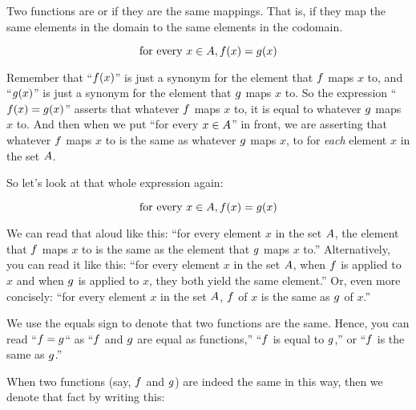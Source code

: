 \documentclass[../../../main.tex]{subfiles}
\begin{document}
\begin{terminology}
  Two functions are  or  if they are the same mappings. That is, if they map the same elements in the domain to the same elements in the codomain.
\end{terminology}

\begin{equation*}
  \text{for every } x \in A, f(x) = g(x)
\end{equation*}

Remember that ``$f(x)$'' is just a synonym for the element that $f$ maps $x$ to, and ``$g(x)$'' is just a synonym for the element that $g$ maps $x$ to. So the expression ``$f(x) = g(x)$'' asserts that whatever $f$ maps $x$ to, it is equal to whatever $g$ maps $x$ to. And then when we put ``for every $x \in A$'' in front, we are asserting that whatever $f$ maps $x$ to is the same as whatever $g$ maps $x$, to for \emph{each} element $x$ in the set $A$.

So let's look at that whole expression again:

\begin{equation*}
  \text{for every } x \in A, f(x) = g(x)
\end{equation*}

We can read that aloud like this: ``for every element $x$ in the set $A$, the element that $f$ maps $x$ to is the same as the element that $g$ maps $x$ to.'' Alternatively, you can read it like this: ``for every element $x$ in the set $A$, when $f$ is applied to $x$ and when $g$ is applied to $x$, they both yield the same element.'' Or, even more concisely: ``for every element $x$ in the set $A$, $f$ of $x$ is the same as $g$ of $x$.''

\begin{aside}
  \begin{remark}
    We use the equals sign to denote that two functions are the same. Hence, you can read ``$f = g$`` as ``$f$ and $g$ are equal as functions,'' ``$f$ is equal to $g$,'' or ``$f$ is the same as $g$.''
  \end{remark}
\end{aside}

When two functions (say, $f$ and $g$) are indeed the same in this way, then we denote that fact by writing this:
\end{document}
